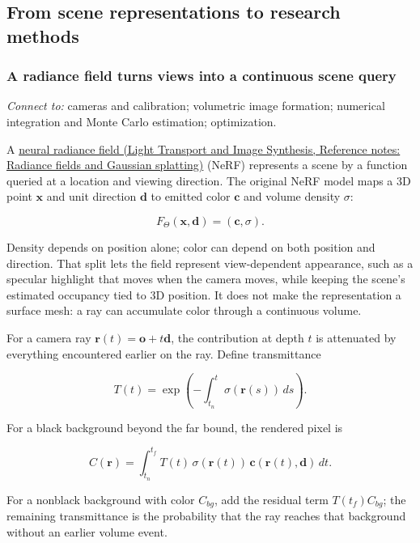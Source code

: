 \subsection{From scene representations to research methods}\label{04-visual-computing-ii-ch034-from-scene-representations-to-research-methods}

\subsubsection{A radiance field turns views into a continuous scene query}\label{04-visual-computing-ii-ch034-a-radiance-field-turns-views-into-a-continuous-scene-query}

\emph{Connect to:} cameras and calibration; volumetric image formation; numerical integration and Monte Carlo estimation; optimization.

A \href{../04-Light-Transport-and-Image-Synthesis/main.pdf\#nameddest=appendix-c5b332e400e7}{neural radiance field (Light Transport and Image Synthesis, Reference notes: Radiance fields and Gaussian splatting)} (NeRF) represents a scene by a function queried at a location and viewing direction. The original NeRF model maps a 3D point \(\mathbf{x}\) and unit direction \(\mathbf{d}\) to emitted color \(\mathbf{c}\) and volume density \(\sigma\):

\[F_\Theta(\mathbf{x},\mathbf{d})=(\mathbf{c},\sigma).\]

Density depends on position alone; color can depend on both position and direction. That split lets the field represent view-dependent appearance, such as a specular highlight that moves when the camera moves, while keeping the scene's estimated occupancy tied to 3D position. It does not make the representation a surface mesh: a ray can accumulate color through a continuous volume.

For a camera ray \(\mathbf{r}(t)=\mathbf{o}+t\mathbf{d}\), the contribution at depth \(t\) is attenuated by everything encountered earlier on the ray. Define transmittance

\[T(t)=\exp\left(-\int_{t_n}^{t}\sigma(\mathbf{r}(s))\,ds\right).\]

For a black background beyond the far bound, the rendered pixel is

\[C(\mathbf{r})=\int_{t_n}^{t_f}T(t)\,\sigma(\mathbf{r}(t))\,\mathbf{c}(\mathbf{r}(t),\mathbf{d})\,dt.\]

For a nonblack background with color \(C_{bg}\), add the residual term \(T(t_f)C_{bg}\); the remaining transmittance is the probability that the ray reaches that background without an earlier volume event.

